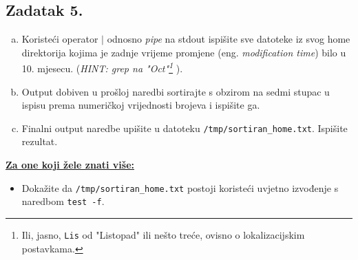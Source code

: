 \documentclass{exam}
\newcommand{\shell}[1]{\texttt{#1}}
\begin{document}
    \subsection*{Zadatak 5.}
    \begin{enumerate}[(a)]
        \item Koristeći operator $\rvert$ odnosno \textit{pipe} na stdout ispišite sve datoteke iz svog home direktorija kojima je zadnje vrijeme promjene (eng. \textit{modification time}) bilo u 10. mjesecu. (\textit{HINT: grep na "Oct"\footnote{Ili,
    jasno, \shell{Lis} od "Listopad" ili nešto treće, ovisno o lokalizacijskim
    postavkama.}
}).
        \item Output dobiven u prošloj naredbi sortirajte s obzirom na sedmi
          stupac u ispisu prema numeričkoj vrijednosti brojeva i ispišite ga.
        \item Finalni output naredbe upišite u datoteku
          \shell{/tmp/sortiran\_home.txt}. Ispišite rezultat.
    \end{enumerate}
    
\underline{\textbf{Za one koji žele znati više:}}
\begin{itemize}
    \item Dokažite da \shell{/tmp/sortiran\_home.txt} postoji koristeći uvjetno izvođenje s naredbom \shell{test -f}.

\end{itemize}
\end{document}
